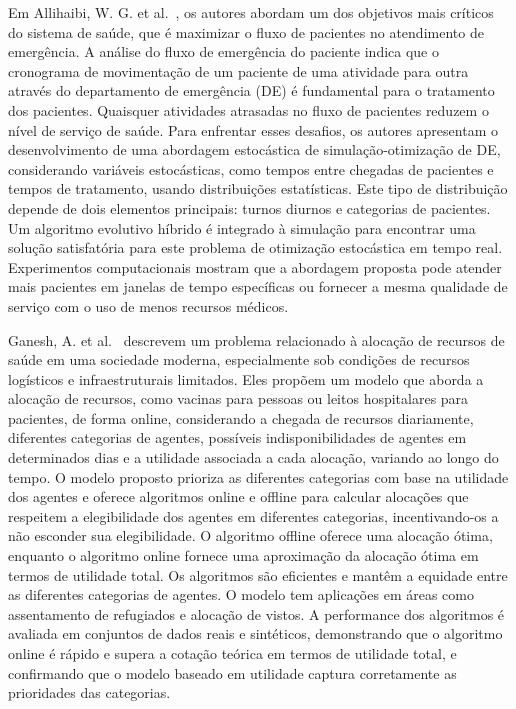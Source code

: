 Em Allihaibi, W. G. et al.~\cite{9481128}, os autores abordam um dos objetivos mais críticos do sistema de saúde, que é maximizar o fluxo de pacientes no atendimento de emergência. A análise do fluxo de emergência do paciente indica que o cronograma de movimentação de um paciente de uma atividade para outra através do departamento de emergência (DE) é fundamental para o tratamento dos pacientes. Quaisquer atividades atrasadas no fluxo de pacientes reduzem o nível de serviço de saúde. Para enfrentar esses desafios, os autores apresentam o desenvolvimento de uma abordagem estocástica de simulação-otimização de DE, considerando variáveis estocásticas, como tempos entre chegadas de pacientes e tempos de tratamento, usando distribuições estatísticas. Este tipo de distribuição depende de dois elementos principais: turnos diurnos e categorias de pacientes. Um algoritmo evolutivo híbrido é integrado à simulação para encontrar uma solução satisfatória para este problema de otimização estocástica em tempo real. Experimentos computacionais mostram que a abordagem proposta pode atender mais pacientes em janelas de tempo específicas ou fornecer a mesma qualidade de serviço com o uso de menos recursos médicos.

Ganesh, A. et al.~\cite{ganesh2023fair} descrevem um problema relacionado à alocação de recursos de saúde em uma sociedade moderna, especialmente sob condições de recursos logísticos e infraestruturais limitados. Eles propõem um modelo que aborda a alocação de recursos, como vacinas para pessoas ou leitos hospitalares para pacientes, de forma online, considerando a chegada de recursos diariamente, diferentes categorias de agentes, possíveis indisponibilidades de agentes em determinados dias e a utilidade associada a cada alocação, variando ao longo do tempo. O modelo proposto prioriza as diferentes categorias com base na utilidade dos agentes e oferece algoritmos online e offline para calcular alocações que respeitem a elegibilidade dos agentes em diferentes categorias, incentivando-os a não esconder sua elegibilidade. O algoritmo offline oferece uma alocação ótima, enquanto o algoritmo online fornece uma aproximação da alocação ótima em termos de utilidade total. Os algoritmos são eficientes e mantêm a equidade entre as diferentes categorias de agentes. O modelo tem aplicações em áreas como assentamento de refugiados e alocação de vistos. A performance dos algoritmos é avaliada em conjuntos de dados reais e sintéticos, demonstrando que o algoritmo online é rápido e supera a cotação teórica em termos de utilidade total, e confirmando que o modelo baseado em utilidade captura corretamente as prioridades das categorias.

